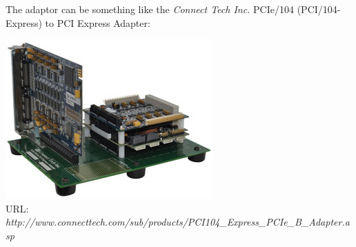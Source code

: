 \documentclass{article}
\begin{document}
The adaptor can be something like the \textit{Connect Tech Inc.} PCIe/104 (PCI/104-Express) to PCI Express Adapter:

\begin{center}
\includegraphics[width=0.75\columnwidth]{./pix/ADG021_web.jpg}\\
URL: \textit{http://www.connecttech.com/sub/products/PCI104\_Express\_PCIe\_B\_Adapter.asp}
\end{center}
\end{document}
